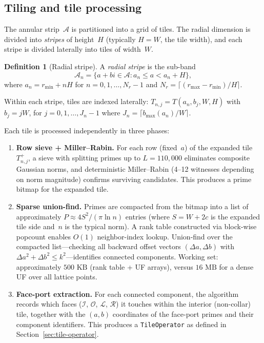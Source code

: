 \documentclass[11pt,a4paper]{article}
\newcommand{\fI}{\mathcal{I}}
\newcommand{\fO}{\mathcal{O}}
\newcommand{\fL}{\mathcal{L}}
\newcommand{\fR}{\mathcal{R}}
\theoremstyle{definition}
\newtheorem{definition}{Definition}[section]
\theoremstyle{plain}
\theoremstyle{remark}
\begin{document}
\subsection{Tiling and tile processing}

The annular strip~$\mathcal{A}$ is partitioned into a grid of tiles.  The radial dimension is divided into \emph{stripes} of height~$H$ (typically $H = W$, the tile width), and each stripe is divided laterally into tiles of width~$W$.

\begin{definition}[Radial stripe]\label{def:radial-stripe}
A \emph{radial stripe} is the sub-band
\[
  \mathcal{A}_n = \{a + bi \in \mathcal{A} : a_n \le a < a_n + H\},
\]
where $a_n = r_{\min} + nH$ for $n = 0, 1, \ldots, N_r - 1$ and $N_r = \lceil(r_{\max} - r_{\min})/H\rceil$.
\end{definition}

Within each stripe, tiles are indexed laterally: $T_{n,j} = T(a_n, b_j, W, H)$ with $b_j = jW$, for $j = 0, 1, \ldots, J_n - 1$ where $J_n = \lceil b_{\max}(a_n) / W \rceil$.

Each tile is processed independently in three phases:
\begin{enumerate}
  \item \textbf{Row sieve + Miller--Rabin.}  For each row (fixed~$a$) of the expanded tile~$T_{n,j}^+$, a sieve with splitting primes up to $L = 110{,}000$ eliminates composite Gaussian norms, and deterministic Miller--Rabin (4--12 witnesses depending on norm magnitude) confirms surviving candidates.  This produces a prime bitmap for the expanded tile.

  \item \textbf{Sparse union-find.}  Primes are compacted from the bitmap into a list of approximately $P \approx 4S^2 / (\pi \ln n)$ entries (where $S = W + 2c$ is the expanded tile side and~$n$ is the typical norm).  A rank table constructed via block-wise popcount enables $O(1)$ neighbor-index lookup.  Union-find over the compacted list---checking all backward offset vectors $(\Delta a, \Delta b)$ with $\Delta a^2 + \Delta b^2 \le k^2$---identifies connected components.  Working set: approximately $500\text{ KB}$ (rank table + UF arrays), versus $16\text{ MB}$ for a dense UF over all lattice points.

  \item \textbf{Face-port extraction.}  For each connected component, the algorithm records which faces ($\fI$, $\fO$, $\fL$, $\fR$) it touches within the interior (non-collar) tile, together with the $(a, b)$ coordinates of the face-port primes and their component identifiers.  This produces a \texttt{TileOperator} as defined in Section~\ref{sec:tile-operator}.
\end{enumerate}
\end{document}
